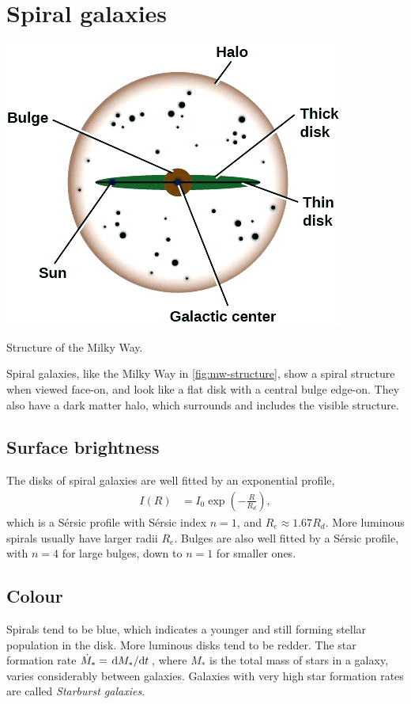 \section{Spiral galaxies}
\begin{marginfigure}
	\includegraphics[width=\textwidth]{img/ch-05/milky-way.png}
	\caption{Structure of the Milky Way.}
	\label{fig:mw-structure}
\end{marginfigure}
Spiral galaxies, like the Milky Way in \cref{fig:mw-structure}, show a spiral structure when viewed face-on, and look like a flat disk with a central bulge edge-on.
They also have a dark matter halo, which surrounds and includes the visible structure.

\subsection{Surface brightness}
The disks of spiral galaxies are well fitted by an exponential profile,
\begin{align*}
	I(R)
	&= I_0 \exp\left( -\frac{R}{R_d} \right),
\end{align*}
which is a Sérsic profile with Sérsic index $n=1$,
and $R_e \approx 1.67 R_d$.
More luminous spirals usually have larger radii $R_e$.
Bulges are also well fitted by a Sérsic profile, with $n = 4$ for large bulges, down to $n=1$ for smaller ones.

\subsection{Colour}
Spirals tend to be blue, which indicates a younger and still forming stellar population in the disk.
More luminous disks tend to be redder.
The star formation rate $\dot{M}_* = \dv*{M_*}{t}$, where $M_*$ is the total mass of stars in a galaxy, varies considerably between galaxies.
Galaxies with very high star formation rates are called \emph{Starburst galaxies}.

